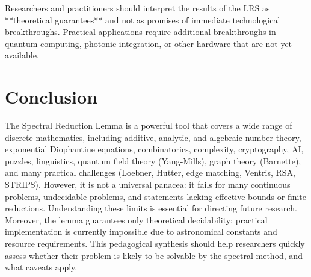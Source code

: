\documentclass[11pt,a4paper]{article}
\begin{document}
Researchers and practitioners should interpret the results of the LRS as **theoretical guarantees** and not as promises of immediate technological breakthroughs. Practical applications require additional breakthroughs in quantum computing, photonic integration, or other hardware that are not yet available.

\section{Conclusion}

The Spectral Reduction Lemma is a powerful tool that covers a wide range of discrete mathematics, including additive, analytic, and algebraic number theory, exponential Diophantine equations, combinatorics, complexity, cryptography, AI, puzzles, linguistics, quantum field theory (Yang‑Mills), graph theory (Barnette), and many practical challenges (Loebner, Hutter, edge matching, Ventris, RSA, STRIPS). However, it is not a universal panacea: it fails for many continuous problems, undecidable problems, and statements lacking effective bounds or finite reductions. Understanding these limits is essential for directing future research. Moreover, the lemma guarantees only theoretical decidability; practical implementation is currently impossible due to astronomical constants and resource requirements. This pedagogical synthesis should help researchers quickly assess whether their problem is likely to be solvable by the spectral method, and what caveats apply.
\end{document}
